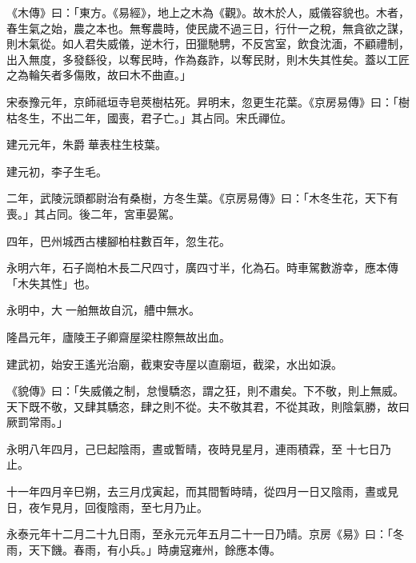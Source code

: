 
\begin{pinyinscope}

 《木傳》曰：「東方。《易經》，地上之木為《觀》。故木於人，威儀容貌也。木者，春生氣之始，農之本也。無奪農時，使民歲不過三日，行什一之稅，無貪欲之謀，則木氣從。如人君失威儀，逆木行，田獵馳騁，不反宮室，飲食沈湎，不顧禮制，出入無度，多發繇役，以奪民時，作為姦詐，以奪民財，則木失其性矣。蓋以工匠之為輪矢者多傷敗，故曰木不曲直。」



 宋泰豫元年，京師祗垣寺皂莢樹枯死。昇明末，忽更生花葉。《京房易傳》曰：「樹枯冬生，不出二年，國喪，君子亡。」其占同。宋氏禪位。



 建元元年，朱爵𦨵華表柱生枝葉。



 建元初，李子生毛。



 二年，武陵沅頭都尉治有桑樹，方冬生葉。《京房易傳》曰：「木冬生花，天下有喪。」其占同。後二年，宮車晏駕。



 四年，巴州城西古樓腳柏柱數百年，忽生花。



 永明六年，石子崗柏木長二尺四寸，廣四寸半，化為石。時車駕數游幸，應本傳「木失其性」也。



 永明中，大𦨵一舶無故自沉，艚中無水。



 隆昌元年，廬陵王子卿齋屋梁柱際無故出血。



 建武初，始安王遙光治廟，截東安寺屋以直廟垣，截梁，水出如淚。



 《貌傳》曰：「失威儀之制，怠慢驕恣，謂之狂，則不肅矣。下不敬，則上無威。天下既不敬，又肆其驕恣，肆之則不從。夫不敬其君，不從其政，則陰氣勝，故曰厥罰常雨。」



 永明八年四月，己巳起陰雨，晝或暫晴，夜時見星月，連雨積霖，至
 十七日乃止。



 十一年四月辛巳朔，去三月戊寅起，而其間暫時晴，從四月一日又陰雨，晝或見日，夜乍見月，回復陰雨，至七月乃止。



 永泰元年十二月二十九日雨，至永元元年五月二十一日乃晴。京房《易》曰：「冬雨，天下饑。春雨，有小兵。」時虜寇雍州，餘應本傳。




\end{pinyinscope}
